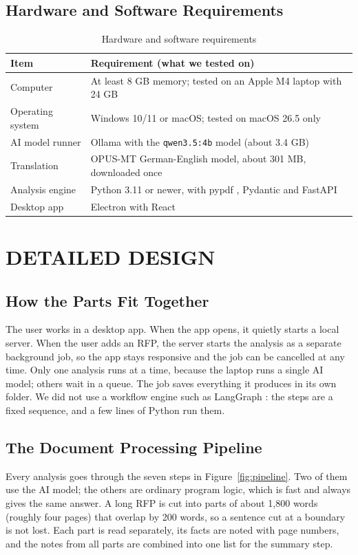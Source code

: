 \documentclass[11pt,a4paper,oneside]{report}
\newcommand{\nonum}{}%
\begin{document}
\section{Hardware and Software Requirements}
\begin{table}[H]
\centering
\caption{Hardware and software requirements}
\label{tab:hw}
\small
\begin{tabularx}{\linewidth}{@{}p{3.3cm}L@{}}
\toprule
Item & Requirement (what we tested on)\\
\midrule
Computer & At least 8 GB memory; tested on an Apple M4 laptop with 24 GB\\
Operating system & Windows 10/11 or macOS; tested on macOS 26.5 only\\
AI model runner & Ollama \cite{ollama} with the \texttt{qwen3.5:4b} model \cite{qwen35} (about 3.4 GB)\\
Translation & OPUS-MT German-English model, about 301 MB, downloaded once\\
Analysis engine & Python 3.11 or newer, with pypdf \cite{pypdf}, Pydantic \cite{pydantic} and FastAPI \cite{fastapi}\\
Desktop app & Electron \cite{electron} with React\\
\bottomrule
\end{tabularx}
\end{table}

\chapter{DETAILED DESIGN}\nonum

\section{How the Parts Fit Together}
The user works in a desktop app. When the app opens, it quietly starts a local server. When the user
adds an RFP, the server starts the analysis as a separate background job, so the app stays responsive
and the job can be cancelled at any time. Only one analysis runs at a time, because the laptop runs a
single AI model; others wait in a queue. The job saves everything it produces in its own folder. We
did not use a workflow engine such as LangGraph \cite{langgraph}: the steps are a fixed sequence, and
a few lines of Python run them.

\section{The Document Processing Pipeline}
Every analysis goes through the seven steps in Figure~\ref{fig:pipeline}. Two of them use the AI
model; the others are ordinary program logic, which is fast and always gives the same answer. A
long RFP is cut into parts of about 1,800 words (roughly four pages) that overlap by 200 words, so a
sentence cut at a boundary is not lost. Each part is read separately, its facts are noted with page
numbers, and the notes from all parts are combined into one list for the summary step.
\end{document}
